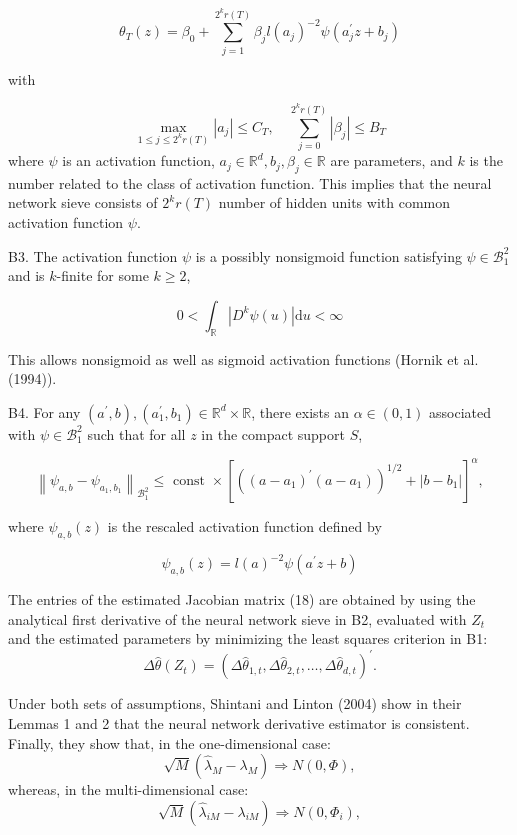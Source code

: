 \documentclass[12pt]{article}
\begin{document}
$$
\theta_{T}(z)=\beta_{0}+\sum_{j=1}^{2^{k} r(T)} \beta_{j} l\left(a_{j}\right)^{-2} \psi\left(a_{j}^{\prime} z+b_{j}\right)
$$

with

$$
\max _{1 \leqslant j \leqslant 2^{k} r(T)}\left|a_{j}\right| \leqslant C_{T}, \quad \sum_{j=0}^{2^{k} r(T)}\left|\beta_{j}\right| \leqslant B_{T}
$$
where $\psi$ is an activation function, $a_{j} \in \mathbb{R}^{d}, b_{j}, \beta_{j} \in \mathbb{R}$ are parameters, and $k$ is the number related to the class of activation function.
This implies that the neural network
sieve consists of $2^{k} r(T)$ number of hidden units with common activation function $\psi$.





B3. The activation function $\psi$ is a possibly nonsigmoid function satisfying $\psi \in \mathscr{B}_{1}^{2}$ and is $k$-finite for some $k \geqslant 2$,

$$
0<\int_{\mathbb{R}}\left|D^{k} \psi(u)\right| \mathrm{d} u<\infty
$$

This  allows nonsigmoid as well as sigmoid activation functions (Hornik et al. (1994)).

B4. For any $\left(a^{\prime}, b\right),\left(a_{1}^{\prime}, b_{1}\right) \in \mathbb{R}^{d} \times \mathbb{R}$, there exists an $\alpha \in(0,1)$ associated with $\psi \in \mathscr{B}_{1}^{2}$ such that for all $z$ in the compact support $S$,

$$
\left\|\psi_{a, b}-\psi_{a_{1}, b_{1}}\right\|_{\mathscr{B}_{1}^{2}} \leqslant \text { const } \times\left[\left(\left(a-a_{1}\right)^{\prime}\left(a-a_{1}\right)\right)^{1 / 2}+\left|b-b_{1}\right|\right]^{\alpha},
$$

where $\psi_{a, b}(z)$ is the rescaled activation function defined by

$$
\psi_{a, b}(z)=l(a)^{-2} \psi\left(a^{\prime} z+b\right)
$$

The entries of the estimated Jacobian matrix (18) are obtained by using the analytical first derivative of the neural network sieve in B2, evaluated with $Z_t$ and the estimated parameters by minimizing the least squares criterion in B1:
\begin{equation*}
\Delta \hat{\theta}\left(Z_{t}\right)=\left(\Delta \hat{\theta}_{1, t}, \Delta \hat{\theta}_{2, t}, \ldots, \Delta \hat{\theta}_{d, t}\right)^{\prime}.
\end{equation*} 
 
Under both sets of assumptions, Shintani and Linton (2004) show in their Lemmas 1 and 2 that the neural network derivative estimator is consistent.
Finally, they show that, in the one-dimensional case:
\begin{equation}
\sqrt{M}(\hat{\lambda}_{M}-\lambda_{M})\Rightarrow N(0,\Phi),
\end{equation} 
whereas, in the multi-dimensional case:
\begin{equation}
\sqrt{M}(\hat{\lambda}_{iM}-\lambda_{iM})\Rightarrow N(0,\Phi_i),
\end{equation} 
\end{document}
